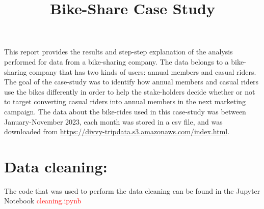 \documentclass[12pt]{article}
\begin{document}
\title{Bike-Share Case Study}
\date{}
\maketitle

This report provides the results and step-step explanation of the analysis performed for data from a bike-sharing company. The data belongs to a bike-sharing company that has two kinds of users: annual members and casual riders. The goal of the case-study was to identify how annual members and casual riders use the bikes differently in order to help the stake-holders decide whether or not to target converting casual riders into annual members in the next marketing campaign. The data about the bike-rides used in this case-study was between January-November 2023, each month was stored in a csv file, and was downloaded from \href{https://divvy-tripdata.s3.amazonaws.com/index.html}{https://divvy-tripdata.s3.amazonaws.com/index.html}.

\section*{Data cleaning:}
The code that was used to perform the data cleaning can be found in the Jupyter Notebook \textcolor{red}{cleaning.ipynb}
\end{document}
